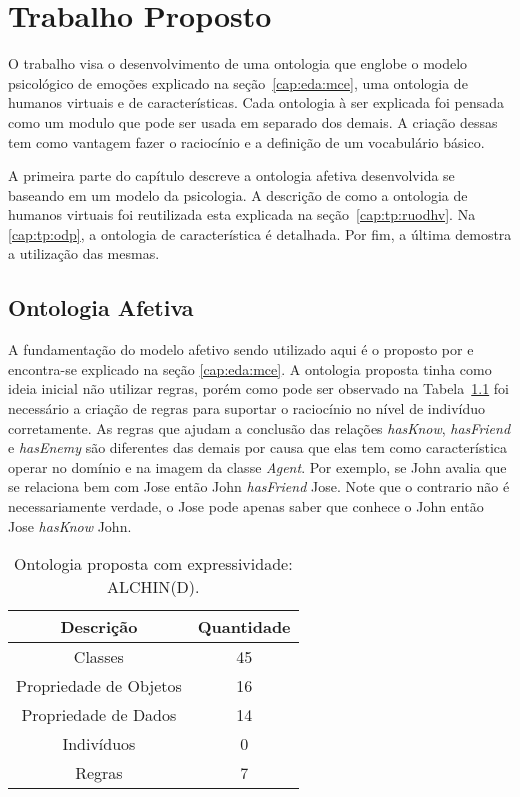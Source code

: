 \chapter{Trabalho Proposto} \label{cap:tp}

O trabalho visa o desenvolvimento de uma ontologia que englobe o modelo
psicológico de emoções explicado na seção~\ref{cap:eda:mce}, uma ontologia de
humanos virtuais e de características. Cada ontologia à ser explicada foi pensada
como um modulo que pode ser usada em separado dos demais. A criação dessas
tem como vantagem fazer o raciocínio e a definição de um vocabulário
básico.

A primeira parte do capítulo descreve a ontologia afetiva desenvolvida se
baseando em um modelo da psicologia. A descrição de como a ontologia de
humanos virtuais foi reutilizada esta explicada na seção~\ref{cap:tp:ruodhv}.
Na \ref{cap:tp:odp}, a ontologia de característica é detalhada. Por fim, a
última demostra a utilização das mesmas.

\section{Ontologia Afetiva} \label{cap:tp:oa}

A fundamentação do modelo afetivo sendo utilizado aqui é o proposto por
\citet{ortony1988cse} e encontra-se explicado na seção \ref{cap:eda:mce}. A
ontologia proposta tinha como ideia inicial não utilizar regras, porém como
pode ser observado na Tabela~\ref{tab:oa:geral} foi necessário a criação de
regras para suportar o raciocínio no nível de indivíduo corretamente. As
regras que ajudam a conclusão das relações \emph{hasKnow}, \emph{hasFriend} e
\emph{hasEnemy} são diferentes das demais por causa que elas tem como
característica operar no domínio e na imagem da classe \emph{Agent}. Por
exemplo, se John avalia que se relaciona bem com Jose então John
\emph{hasFriend} Jose. Note que o contrario não é necessariamente verdade, o
Jose pode apenas saber que conhece o John então Jose \emph{hasKnow} John.

\begin{table}
	\caption{Ontologia proposta com expressividade: ALCHIN(D).}
	\label{tab:oa:geral}
	\begin{center}
	\begin{tabular}{|c|c|}
		\hline
		Descrição & Quantidade \\ \hline
		Classes &  45 		\\ \hline
		Propriedade de Objetos & 16 \\ \hline
		Propriedade de Dados & 14 \\ \hline
		Indivíduos &  0		\\ \hline
		Regras & 7 \\ \hline
	\end{tabular}
	\end{center}
\end{table}

